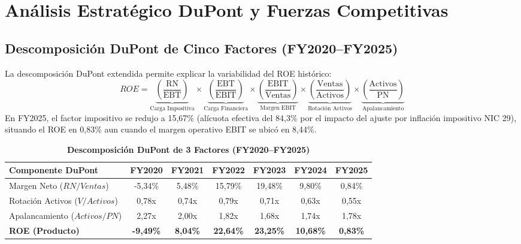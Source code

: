 \documentclass[10pt,a4paper]{article}
\begin{document}
\section{Análisis Estratégico DuPont y Fuerzas Competitivas}

\subsection{Descomposición DuPont de Cinco Factores (FY2020--FY2025)}
La descomposición DuPont extendida permite explicar la variabilidad del ROE histórico:
\begin{equation}
    ROE = \underbrace{\left(\frac{\text{RN}}{\text{EBT}}\right)}_{\text{Carga Impositiva}} \times \underbrace{\left(\frac{\text{EBT}}{\text{EBIT}}\right)}_{\text{Carga Financiera}} \times \underbrace{\left(\frac{\text{EBIT}}{\text{Ventas}}\right)}_{\text{Margen EBIT}} \times \underbrace{\left(\frac{\text{Ventas}}{\text{Activos}}\right)}_{\text{Rotación Activos}} \times \underbrace{\left(\frac{\text{Activos}}{\text{PN}}\right)}_{\text{Apalancamiento}}
\end{equation}
En FY2025, el factor impositivo se redujo a 15,67\% (alícuota efectiva del 84,3\% por el impacto del ajuste por inflación impositivo NIC 29), situando el ROE en 0,83\% aun cuando el margen operativo EBIT se ubicó en 8,44\%.

\begin{table}[H]
\centering
\caption{\textbf{Descomposición DuPont de 3 Factores (FY2020--FY2025)}}
\small
\begin{tabularx}{\textwidth}{Xcccccc}
\toprule
\textbf{Componente DuPont} & \textbf{FY2020} & \textbf{FY2021} & \textbf{FY2022} & \textbf{FY2023} & \textbf{FY2024} & \textbf{FY2025} \\
\midrule
Margen Neto ($RN / Ventas$) & -5,34\% & 5,48\% & 15,79\% & 19,48\% & 9,80\% & 0,84\% \\
Rotación Activos ($V / Activos$) & 0,78x & 0,74x & 0,79x & 0,71x & 0,63x & 0,55x \\
Apalancamiento ($Activos / PN$) & 2,27x & 2,00x & 1,82x & 1,68x & 1,74x & 1,78x \\
\midrule
\textbf{ROE (Producto)} & \textbf{-9,49\%} & \textbf{8,04\%} & \textbf{22,64\%} & \textbf{23,25\%} & \textbf{10,68\%} & \textbf{0,83\%} \\
\bottomrule
\end{tabularx}
\end{table}
\end{document}
